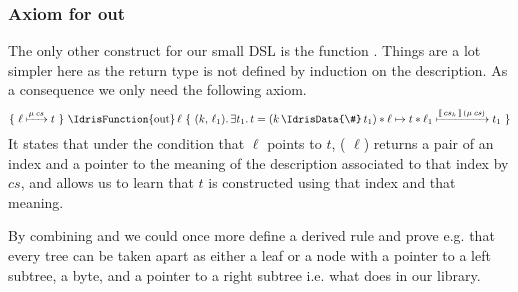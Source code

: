 \subsubsection{Axiom for out}

The only other construct for our small DSL is the function .
Things are a lot simpler here as the return type
is not defined by induction on the description.
As a consequence we only need the following axiom.
\[
\Hoare
    {\Pointer{\ell}{\Mu{cs}}{t}}
    {\text{\IdrisFunction{out}}\,\ell}
    {(k,\, \ell_1)}
    {\exists t_1.\, t = (k \,\text{\IdrisData{\#}}\, t_1)
      \ast \Pointer{\ell}{}{t} \ast \Pointer{\ell_1}{\Meaning{cs_k}{cs}}{t_1}}
\]
It states that under the condition that $\ell$ points to $t$,
( $\ell$) returns a pair of an index
and a pointer to the meaning of the description associated to that index by $cs$,
and allows us to learn that $t$ is constructed using that index
and that meaning.

By combining  and  we could once
more define a derived rule and prove e.g. that every tree can be taken
apart as either a leaf or a node with a pointer to a left subtree, a byte,
and a pointer to a right subtree i.e. what  does in
our library.
